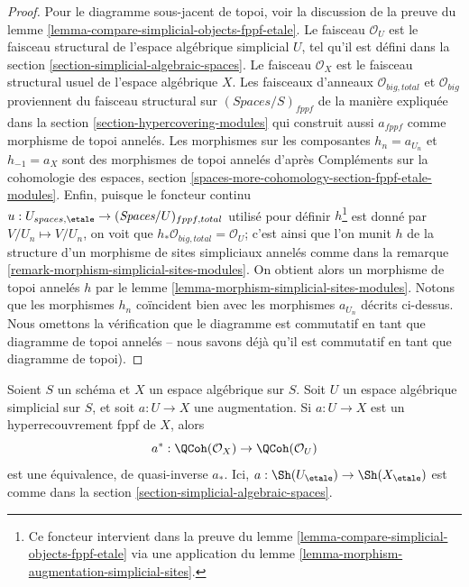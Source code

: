 \begin{proof}
Pour le diagramme sous-jacent de topoi, voir la discussion de
la preuve du lemme \ref{lemma-compare-simplicial-objects-fppf-etale}.
Le faisceau $\mathcal{O}_U$ est le faisceau structural de l'espace algébrique simplicial
$U$, tel qu'il est défini dans la section
\ref{section-simplicial-algebraic-spaces}.
Le faisceau $\mathcal{O}_X$ est le faisceau structural usuel de l'espace algébrique
$X$. Les faisceaux d'anneaux $\mathcal{O}_{big, total}$ et
$\mathcal{O}_{big}$ proviennent du faisceau structural sur
$(\textit{Spaces}/S)_{fppf}$ de la manière expliquée dans la section
\ref{section-hypercovering-modules}
qui construit aussi $a_{fppf}$ comme morphisme de topoi annelés.
Les morphismes sur les composantes $h_n = a_{U_n}$ et $h_{-1} = a_X$
sont des morphismes de topoi annelés d'après
Compléments sur la cohomologie des espaces, section
\ref{spaces-more-cohomology-section-fppf-etale-modules}.
Enfin, puisque le foncteur continu
$u : U_{spaces, \etale} \to (\textit{Spaces}/U)_{fppf, total}$
utilisé pour définir $h$\footnote{Ce foncteur intervient dans la preuve du
lemme \ref{lemma-compare-simplicial-objects-fppf-etale}
via une application du lemme
\ref{lemma-morphism-augmentation-simplicial-sites}.}
est donné par $V/U_n \mapsto V/U_n$,
on voit que $h_*\mathcal{O}_{big, total} = \mathcal{O}_U$;
c'est ainsi que l'on munit $h$ de la structure d'un morphisme
de sites simpliciaux annelés comme dans
la remarque \ref{remark-morphism-simplicial-sites-modules}.
On obtient alors un morphisme de topoi annelés $h$
par le lemme \ref{lemma-morphism-simplicial-sites-modules}.
Notons que les morphismes $h_n$ coïncident bien
avec les morphismes $a_{U_n}$ décrits ci-dessus.
Nous omettons la vérification
que le diagramme est commutatif en tant que diagramme de topoi annelés
-- nous savons déjà qu'il est commutatif
en tant que diagramme de topoi).
\end{proof}

\begin{lemma}
\label{lemma-descent-qcoh-for-fppf-hypercovering}
Soient $S$ un schéma et $X$ un espace algébrique sur $S$.
Soit $U$ un espace algébrique simplicial sur $S$, et soit $a : U \to X$
une augmentation. Si $a : U \to X$ est un hyperrecouvrement fppf de $X$,
alors
$$
a^* : \QCoh(\mathcal{O}_X) \to \QCoh(\mathcal{O}_U)
$$
est une équivalence, de quasi-inverse $a_*$.
Ici, $a : \Sh(U_\etale) \to \Sh(X_\etale)$
est comme dans la section \ref{section-simplicial-algebraic-spaces}.
\end{lemma}

